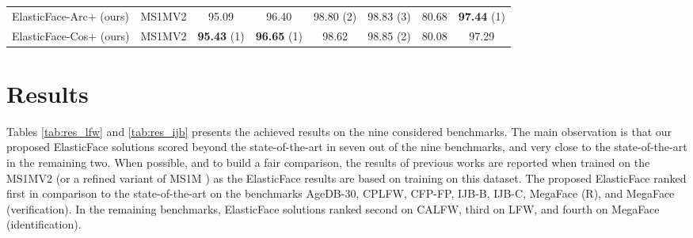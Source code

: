 \documentclass[letterpaper, 10 pt, conference]{ieeeconf}  \usepackage{times}
\begin{document}
\begin{table*}[ht!]
{\begin{tabular}{|l|c|c|c|c|c|c|c|}
ElasticFace-Arc+ (ours)   & MS1MV2  \cite{DBLP:conf/eccv/GuoZHHG16,deng2019arcface}                                                                    &95.09          & 96.40          & 98.80 (2) & 98.83  (3)                                              & 80.68          &  \textbf{97.44 }  (1)                                                      \\
ElasticFace-Cos+ (ours)   & MS1MV2 \cite{DBLP:conf/eccv/GuoZHHG16,deng2019arcface}                                                                     & \textbf{95.43} (1) & \textbf{96.65} (1) & 98.62           & 98.85   (2)                                                       & 80.08          & 97.29                                                          \\ \hline
\end{tabular}
}
\vspace{2mm}
\caption{The achieved results on the IJB-B, IJB-C, MegaFace (R), and MegaFace benchmarks. On the earlier three, and the verification accuracy of the fourth, the ElasticFace solutions consistently extend state-of-the-art performances. ElasticFace scores very close to the state-of-the-art on MegaFace. MegaFace has been refined in \cite{deng2019arcface} to MegaFace (R) as it contains many face images with wrong labels. All decimal points are provided as reported in the respective works. The top performance in each benchmark is in bold. The top three performances in each benchmark are noted with rank number between parentheses (1,2 or 3). }
\label{tab:res_ijb}
\end{table*}



\section{Results}
\label{sec:res}

Tables \ref{tab:res_lfw} and \ref{tab:res_ijb} presents the achieved results on the nine considered benchmarks. The main observation is that our proposed ElasticFace solutions scored beyond the state-of-the-art in seven out of the nine benchmarks, and very close to the state-of-the-art in the remaining two. When possible, and to build a fair comparison, the results of previous works are reported when trained on the MS1MV2 \cite{DBLP:conf/eccv/GuoZHHG16,deng2019arcface} (or a refined variant of MS1M \cite{DBLP:conf/eccv/GuoZHHG16}) as the ElasticFace results are based on training on this dataset.
The proposed ElasticFace ranked first in comparison to the state-of-the-art on the benchmarks AgeDB-30, CPLFW, CFP-FP, IJB-B, IJB-C, MegaFace (R), and MegaFace (verification). In the remaining benchmarks, ElasticFace solutions ranked second on CALFW, third on LFW, and fourth on MegaFace (identification).
\end{document}
